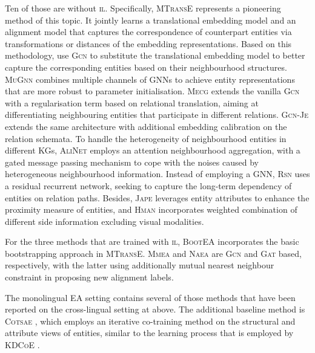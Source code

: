 \documentclass[letterpaper]{article} \usepackage{aaai21}  \usepackage{times}  \usepackage{helvet} \usepackage{courier}  \usepackage[hyphens]{url}  \usepackage{graphicx} \urlstyle{rm} \def\UrlFont{\rm}  \usepackage{natbib}  \usepackage{caption} \frenchspacing  \setlength{\pdfpagewidth}{8.5in}  \setlength{\pdfpageheight}{11in}
\begin{document}
Ten of those are without \textsc{il}. Specifically, \textsc{MTransE} \cite{chen2017multigraph} represents a pioneering method of this topic. It jointly learns a translational embedding model \cite{bordes2013translating} and an alignment model that captures the correspondence of counterpart entities via transformations or distances of the embedding representations.
Based on this methodology, \citet{wang2018cross} use \textsc{Gcn} \citep{kipf2017semi} to substitute the translational embedding model to better capture the corresponding entities based on their neighbourhood structures.
\textsc{MuGnn} \citep{cao2019multi} combines multiple channels of GNNs to achieve entity representations that are more robust to parameter initialisation.
\textsc{Mecg} \citep{li2019semi} extends the vanilla \textsc{Gcn} with a regularisation term based on relational translation, aiming at differentiating 
neighbouring entities that participate in different relations.
\textsc{Gcn-Je} \citep{wu2019jointly} extends the same architecture with additional embedding calibration on the relation schemata.
To handle the heterogeneity of neighbourhood entities in different KGs, \textsc{AliNet} employs an attention neighbourhood aggregation, with a gated message passing mechanism to cope with the noises caused by heterogeneous neighbourhood information.
Instead of employing a GNN, \textsc{Rsn} \citep{guo2019learning} uses a residual recurrent network, seeking to capture the long-term dependency of entities on relation paths.
Besides, \textsc{Jape} \citep{sun2017cross} leverages entity attributes to enhance the proximity measure of entities, and \textsc{Hman} \citep{yang2019aligning} incorporates weighted combination of different side information excluding visual modalities.

For the three methods that are trained with \textsc{il}, 
\textsc{BootEA} \citep{sun2018bootstrapping} incorporates the basic bootstrapping approach in \textsc{MTransE}.
\textsc{Mmea} \citep{shi2019modeling} and \textsc{Naea} \citep{zhu2019neighborhood} are \textsc{Gcn} and \textsc{Gat} based, respectively, with the latter using additionally mutual nearest neighbour constraint in proposing new alignment labels.

The monolingual EA setting contains several of those methods that have been reported on the cross-lingual setting at above. The additional baseline method is \textsc{Cotsae} \citep{yang2020cotsae}, which employs an iterative co-training method on the structural and attribute views of entities, similar to the learning process that is employed by \textsc{KDCoE} \citep{chen2018co}.
\end{document}

